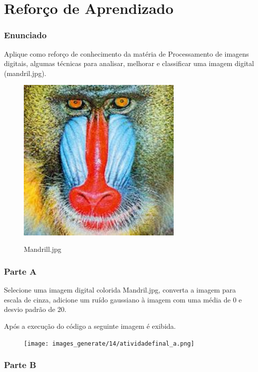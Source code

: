 \documentclass[10pt,a4paper]{article}
\begin{document}
\section{Reforço de Aprendizado}

\subsubsection{Enunciado}
Aplique como reforço de conhecimento da matéria de Processamento de imagens digitais, algumas técnicas para analisar, melhorar e classificar uma imagem digital (mandril.jpg).

\begin{figure}[H]
    \centering
    {{\includegraphics[width=8cm]{images_original/14/Mandrill.jpg}}}
    \caption{Mandrill.jpg}
\end{figure}

\subsubsection{Parte A}

Selecione uma imagem digital colorida Mandril.jpg, converta a imagem para escala de cinza, adicione um ruído gaussiano à imagem com uma média de 0 e desvio padrão de 20. 



Após a execução do código a seguinte imagem é exibida.

\begin{figure}[H]
    \centering
    {{\texttt{[image: images\_generate/14/atividadefinal\_a.png]}}}
\end{figure}

\subsubsection{Parte B}
\end{document}
